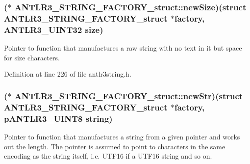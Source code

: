 \hypertarget{struct_a_n_t_l_r3___s_t_r_i_n_g___f_a_c_t_o_r_y__struct_aea18c862567e788758f8a3b2f8d7f3e3}{
\subsubsection[{new\-Size}]{($\ast$ A\-N\-T\-L\-R3\-\_\-\-S\-T\-R\-I\-N\-G\-\_\-\-F\-A\-C\-T\-O\-R\-Y\-\_\-struct\-::new\-Size)(struct {\bf A\-N\-T\-L\-R3\-\_\-\-S\-T\-R\-I\-N\-G\-\_\-\-F\-A\-C\-T\-O\-R\-Y\-\_\-struct} $\ast$factory, {\bf A\-N\-T\-L\-R3\-\_\-\-U\-I\-N\-T32} {\bf size})}}\label{struct_a_n_t_l_r3___s_t_r_i_n_g___f_a_c_t_o_r_y__struct_aea18c862567e788758f8a3b2f8d7f3e3}
Pointer to function that manufactures a raw string with no text in it but space for size characters. 

Definition at line 226 of file antlr3string.\-h.

\hypertarget{struct_a_n_t_l_r3___s_t_r_i_n_g___f_a_c_t_o_r_y__struct_a7aa8c7669f01a6da359ca0729d635dd7}{
\subsubsection[{new\-Str}]{($\ast$ A\-N\-T\-L\-R3\-\_\-\-S\-T\-R\-I\-N\-G\-\_\-\-F\-A\-C\-T\-O\-R\-Y\-\_\-struct\-::new\-Str)(struct {\bf A\-N\-T\-L\-R3\-\_\-\-S\-T\-R\-I\-N\-G\-\_\-\-F\-A\-C\-T\-O\-R\-Y\-\_\-struct} $\ast$factory, {\bf p\-A\-N\-T\-L\-R3\-\_\-\-U\-I\-N\-T8} string)}}\label{struct_a_n_t_l_r3___s_t_r_i_n_g___f_a_c_t_o_r_y__struct_a7aa8c7669f01a6da359ca0729d635dd7}
Pointer to function that manufactures a string from a given pointer and works out the length. The pointer is assumed to point to characters in the same encoding as the string itself, i.\-e. U\-T\-F16 if a U\-T\-F16 string and so on. 

